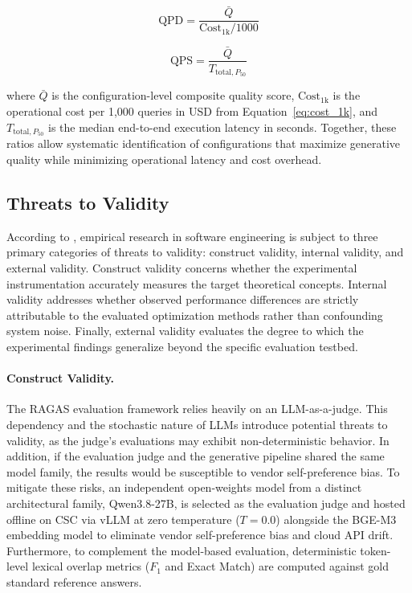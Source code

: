 \begin{equation}
\label{eq:qpd}
\text{QPD} = \frac{\bar{Q}}{\text{Cost}_{1\text{k}} / 1000}
\end{equation}

\begin{equation}
\label{eq:qps}
\text{QPS} = \frac{\bar{Q}}{T_{\text{total}, P_{50}}}
\end{equation}

where $\bar{Q}$ is the configuration-level composite quality score, $\text{Cost}_{1\text{k}}$ is the operational cost per 1,000 queries in USD from Equation~\ref{eq:cost_1k}, and $T_{\text{total}, P_{50}}$ is the median end-to-end execution latency in seconds. Together, these ratios allow systematic identification of configurations that maximize generative quality while minimizing operational latency and cost overhead.

\subsection{Threats to Validity}
\label{subsec:threats_to_validity}

According to \citet{wohlin2012experimentation}, empirical research in software engineering is subject to three primary categories of threats to validity: construct validity, internal validity, and external validity. Construct validity concerns whether the experimental instrumentation accurately measures the target theoretical concepts. Internal validity addresses whether observed performance differences are strictly attributable to the evaluated optimization methods rather than confounding system noise. Finally, external validity evaluates the degree to which the experimental findings generalize beyond the specific evaluation testbed.

\paragraph{Construct Validity.}
The RAGAS evaluation framework relies heavily on an LLM-as-a-judge. This dependency and the stochastic nature of LLMs introduce potential threats to validity, as the judge's evaluations may exhibit non-deterministic behavior. In addition, if the evaluation judge and the generative pipeline shared the same model family, the results would be susceptible to vendor self-preference bias. To mitigate these risks, an independent open-weights model from a distinct architectural family, Qwen3.8-27B, is selected as the evaluation judge and hosted offline on CSC via vLLM at zero temperature ($T=0.0$) alongside the BGE-M3 embedding model to eliminate vendor self-preference bias and cloud API drift. Furthermore, to complement the model-based evaluation, deterministic token-level lexical overlap metrics ($F_1$ and Exact Match) are computed against gold standard reference answers.

